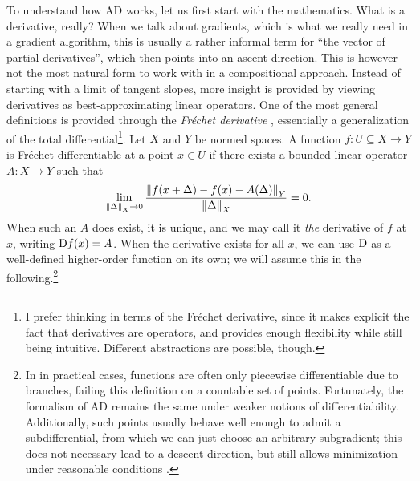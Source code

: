 To understand how AD works, let us first start with the mathematics.  What is a derivative, really?
When we talk about gradients, which is what we really need in a gradient algorithm, this is usually
a rather informal term for \enquote{the vector of partial derivatives}, which then points into an
ascent direction.  This is however not the most natural form to work with in a compositional
approach.  Instead of starting with a limit of tangent slopes, more insight is provided by viewing
derivatives as best-approximating linear operators.  One of the most general definitions is provided
through the \emph{Fréchet derivative} \parencite[p. 463]{bronstein1995taschenbuch}, essentially a
generalization of the total differential\footnote{I prefer thinking in terms of the Fréchet
  derivative, since it makes explicit the fact that derivatives are operators, and provides enough
  flexibility while still being intuitive.  Different abstractions are possible, though.}.  Let
\(X\) and \(Y\) be normed spaces.  A function \(f: U \subseteq X \to Y\) is Fréchet differentiable
at a point \(x \in U\) if there exists a bounded linear operator \(A: X \to Y\) such that
\begin{equation}
  \label{eq:frechet}
  \lim_{\left\lVert\Delta\right\rVert_X \to 0} \frac{\left\lVert f(x + \Delta) - f(x) -
      A(\Delta)\right\rVert_Y}{\left\lVert\Delta\right\rVert_X} = 0.
\end{equation}
When such an \(A\) does exist, it is unique, and we may call it \emph{the} derivative of \(f\) at
\(x\), writing \(\mathop{}\!\mathrm{D} f(x) = A\).  When the derivative exists for all \(x\), we can use \(\mathop{}\!\mathrm{D}\) as
a well-defined higher-order function on its own; we will assume this in the following.\footnote{In
  in practical cases, functions are often only piecewise differentiable due to branches, failing
  this definition on a countable set of points.  Fortunately, the formalism of AD remains the same
  under weaker notions of differentiability.  Additionally, such points usually behave well enough
  to admit a subdifferential, from which we can just choose an arbitrary subgradient; this does not
  necessary lead to a descent direction, but still allows minimization under reasonable conditions
  \parencites[see][section 6.1]{pock2017convex}[][chapter
  14]{griewank2008evaluating}{abadi2020simple}.}


